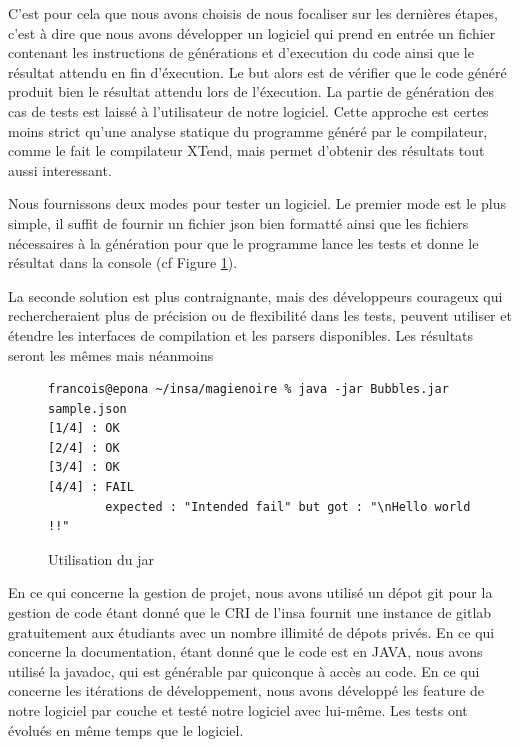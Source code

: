 C'est pour cela que nous avons choisis de nous focaliser sur les dernières étapes, c'est à dire que
nous avons développer un logiciel qui prend en entrée un fichier contenant les instructions de générations et d'execution du code ainsi que le résultat
attendu en fin d'éxecution. Le but alors est de vérifier que le code généré produit bien le résultat attendu lors de l'éxecution. La partie de génération
des cas de tests est laissé à l'utilisateur de notre logiciel. Cette approche est certes moins strict qu'une analyse statique du programme généré par
le compilateur, comme le fait le compilateur XTend, mais permet d'obtenir des résultats tout aussi interessant.

Nous fournissons deux modes pour tester un logiciel. Le premier mode est le plus simple, il suffit de fournir un fichier json bien formatté
ainsi que les fichiers nécessaires à la génération pour que le programme lance les tests et donne le résultat dans la console (cf Figure \ref{mode1}).

La seconde solution est plus contraignante, mais des développeurs courageux qui rechercheraient plus de précision ou de flexibilité dans les tests,
peuvent utiliser et étendre les interfaces de compilation et les parsers disponibles. Les résultats seront les mêmes mais néanmoins

\begin{figure}[!ht]
\begin{lstlisting}
francois@epona ~/insa/magienoire % java -jar Bubbles.jar sample.json
[1/4] : OK
[2/4] : OK
[3/4] : OK
[4/4] : FAIL
        expected : "Intended fail" but got : "\nHello world !!"
\end{lstlisting}
\caption{Utilisation du jar}
\label{mode1}
\end{figure}


En ce qui concerne la gestion de projet, nous avons utilisé un dépot git pour la gestion de code étant donné que le CRI de l'insa fournit une
instance de gitlab gratuitement aux étudiants avec un nombre illimité de dépots privés. En ce qui concerne la documentation, étant donné que le code
est en JAVA, nous avons utilisé la javadoc, qui est générable par quiconque à accès au code. En ce qui concerne les itérations de développement,
nous avons développé les feature de notre logiciel par couche et testé notre logiciel avec lui-même. Les tests ont évolués en même temps que le logiciel.
